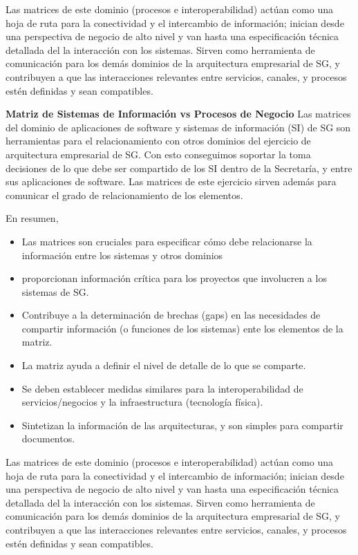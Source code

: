 \documentclass[
	a4paper, %
	12pt, %
]{include/CSSullivanBusinessReport}
\def\tightlist{}
\begin{document}
Las matrices de este dominio (procesos e interoperabilidad) actúan como
una hoja de ruta para la conectividad y el intercambio de información;
inician desde una perspectiva de negocio de alto nivel y van hasta una
especificación técnica detallada del la interacción con los sistemas.
Sirven como herramienta de comunicación para los demás dominios de la
arquitectura empresarial de SG, y contribuyen a que las interacciones
relevantes entre servicios, canales, y procesos estén definidas y sean
compatibles.

\textbf{Matriz de Sistemas de Información vs Procesos de Negocio } Las
matrices del dominio de aplicaciones de software y sistemas de
información (SI) de SG son herramientas para el relacionamiento con
otros dominios del ejercicio de arquitectura empresarial de SG. Con esto
conseguimos soportar la toma decisiones de lo que debe ser compartido de
los SI dentro de la Secretaría, y entre sus aplicaciones de software.
Las matrices de este ejercicio sirven además para comunicar el grado de
relacionamiento de los elementos.

En resumen,

\begin{itemize}
\tightlist
\item
  Las matrices son cruciales para especificar cómo debe relacionarse la
  información entre los sistemas y otros dominios
\item
  proporcionan información crítica para los proyectos que involucren a
  los sistemas de SG.
\item
  Contribuye a la determinación de brechas (gaps) en las necesidades de
  compartir información (o funciones de los sistemas) ente los elementos
  de la matriz.
\item
  La matriz ayuda a definir el nivel de detalle de lo que se comparte.
\item
  Se deben establecer medidas similares para la interoperabilidad de
  servicios/negocios y la infraestructura (tecnología física).
\item
  Sintetizan la información de las arquitecturas, y son simples para
  compartir documentos.
\end{itemize}

Las matrices de este dominio (procesos e interoperabilidad) actúan como
una hoja de ruta para la conectividad y el intercambio de información;
inician desde una perspectiva de negocio de alto nivel y van hasta una
especificación técnica detallada del la interacción con los sistemas.
Sirven como herramienta de comunicación para los demás dominios de la
arquitectura empresarial de SG, y contribuyen a que las interacciones
relevantes entre servicios, canales, y procesos estén definidas y sean
compatibles.
\end{document}
